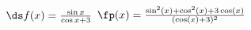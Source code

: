 {$\ds f(x) = \frac{\sin x}{\cos x+3}$
}
{$\fp(x) = \frac{\sin ^2(x)+\cos ^2(x)+3 \cos (x)}{(\cos (x)+3)^2}$
}
